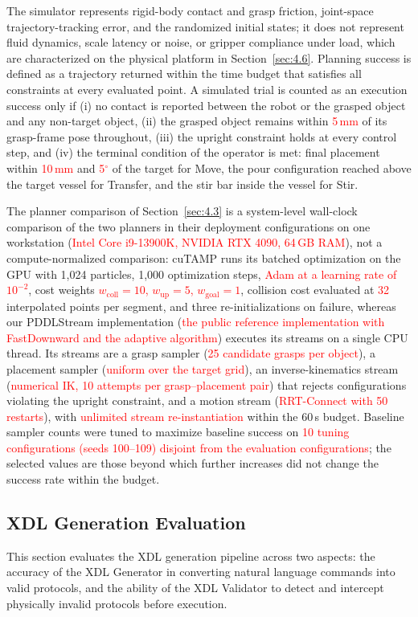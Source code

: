 \documentclass{ieeeaccess}
\newif\ifhighlight
\newcommand{\rev}[1]{\ifhighlight\hl{#1}\else#1\fi}
\newcommand{\nd}[1]{\textcolor{red}{#1}}
\begin{document}
\rev{The simulator represents rigid-body contact and grasp friction, joint-space trajectory-tracking error, and the randomized initial states; it does not represent fluid dynamics, scale latency or noise, or gripper compliance under load, which are characterized on the physical platform in Section~\ref{sec:4.6}.
Planning success is defined as a trajectory returned within the time budget that satisfies all constraints at every evaluated point.
A simulated trial is counted as an execution success only if (i) no contact is reported between the robot or the grasped object and any non-target object, (ii) the grasped object remains within \nd{5\,mm} of its grasp-frame pose throughout, (iii) the upright constraint holds at every control step, and (iv) the terminal condition of the operator is met: final placement within \nd{10\,mm} and \nd{5$^\circ$} of the target for Move, the pour configuration reached above the target vessel for Transfer, and the stir bar inside the vessel for Stir.}

\rev{The planner comparison of Section~\ref{sec:4.3} is a system-level wall-clock comparison of the two planners in their deployment configurations on one workstation (\nd{Intel Core i9-13900K, NVIDIA RTX 4090, 64\,GB RAM}), not a compute-normalized comparison: cuTAMP runs its batched optimization on the GPU with 1,024 particles, 1,000 optimization steps, \nd{Adam at a learning rate of $10^{-2}$}, cost weights \nd{$w_{\mathrm{coll}}=10$, $w_{\mathrm{up}}=5$, $w_{\mathrm{goal}}=1$}, collision cost evaluated at \nd{32} interpolated points per segment, and three re-initializations on failure, whereas our PDDLStream implementation (\nd{the public reference implementation with FastDownward and the adaptive algorithm}) executes its streams on a single CPU thread.
Its streams are a grasp sampler (\nd{25 candidate grasps per object}), a placement sampler (\nd{uniform over the target grid}), an inverse-kinematics stream (\nd{numerical IK, 10 attempts per grasp--placement pair}) that rejects configurations violating the upright constraint, and a motion stream (\nd{RRT-Connect with 50 restarts}), with \nd{unlimited stream re-instantiation} within the 60\,s budget.
Baseline sampler counts were tuned to maximize baseline success on \nd{10 tuning configurations (seeds 100--109) disjoint from the evaluation configurations}; the selected values are those beyond which further increases did not change the success rate within the budget.}

\subsection{XDL Generation Evaluation}\label{sec:4.2}
This section evaluates the XDL generation pipeline across two aspects: the accuracy of the XDL Generator in converting natural language commands into valid protocols, and the ability of the XDL Validator to detect and intercept physically invalid protocols before execution.
\end{document}
